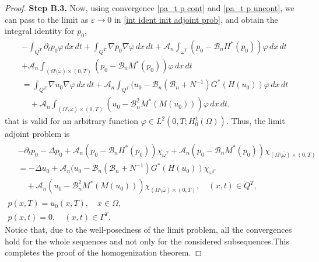 \documentclass[10pt,a4paper]{amsart}
\numberwithin{equation}{section}
\begin{document}
\begin{proof}
\noindent\textbf{Step B.3.}
Now, using convergence \eqref{pa_t p cont} and 
\eqref{pa_t p uncont}, we can pass to the limit as $\varepsilon \to 0$ 
in \eqref{int ident init adjoint prob}, and obtain the integral identity for $p_0$,
\begin{equation}
\begin{aligned}
&-\int _{Q^{T}}\partial _{t}p_0\varphi \,dx\,dt+\int _{Q^{T}}%
\nabla p_0\nabla \varphi \,dx\,dt
+\mathcal{A}_n\int _{\omega ^{T}}(p_0-\mathcal{B}_nH^{\ast
}(p_0))\varphi \,dx\,dt \\
&+\mathcal{A}_n\int _{(\Omega \setminus
\overline{\omega })\times (0,T)}(p_0-\mathcal{B}_nM^{\ast
}(p_0))\varphi \,dx\,dt    \\
&=\int _{Q^{T}}\nabla u_0\nabla \varphi \,dx\,dt+\mathcal{A}%
_n\int _{Q^{T}}(u_0-\mathcal{B}_n(\mathcal{B}_n+N^{-1})G^{\ast
}(H(u_0))\varphi \,dx\,dt    \\
&\quad +\mathcal{A}_n\int _{(\Omega \setminus \overline{\omega })\times
(0,T)}(u_0-\mathcal{B}_n^2M^{\ast }(M(u_0)))\varphi \,dx\,dt,
\end{aligned} \label{p_0 int ident}
\end{equation}
that is valid for an arbitrary function $\varphi \in L^2(0,T;H_0^{1}(\Omega ))$.
Thus, the limit adjoint problem is
\begin{equation}
\begin{gathered}
\begin{aligned}
&-\partial _{t}p_0-\Delta p_0
+\mathcal{A}_n(p_0-\mathcal{B}_nH^{\ast }(p_0))\chi _{\omega ^{T}}+%
\mathcal{A}_n(p_0-\mathcal{B}_nM^{\ast }(p_0))\chi _{(\Omega
\setminus \overline{\omega })\times (0,T)}   \\
&=-\Delta u_0+\mathcal{A}_n(u_0-\mathcal{B}_n(\mathcal{B}%
_n+N^{-1})G^{\ast }(H(u_0))\chi _{\omega ^{T}}  \\
&\quad +\mathcal{A}_n(u_0-\mathcal{B}_n^2M^{\ast }(M(u_0)))\chi _{(\Omega
\setminus \overline{\omega })\times (0,T)}, \quad (x,t)\in Q^{T},
\end{aligned} \\
p(x,T)=u_0(x,T), \quad x\in \Omega , \\
p(x,t)=0, \quad (x,t)\in \Gamma ^{T}.%
\end{gathered}   \label{p_0 limit prob}
\end{equation}
Notice that, due to the well-posedness of the limit problem, all the
convergences hold for the whole sequences and not only for the considered
subsequences.This completes the proof of the homogenization theorem.
\end{proof}
\end{document}
